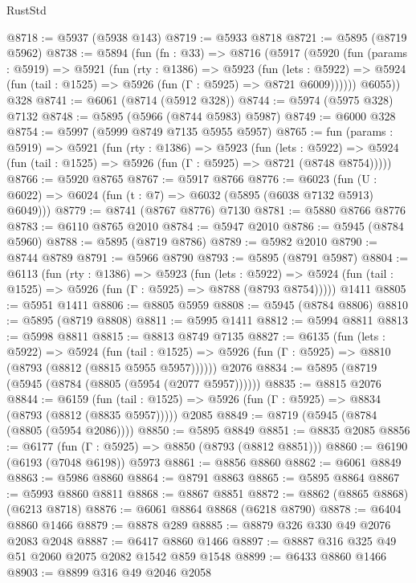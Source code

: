 \begin{lexlean}{RustStd}
\begin{coremodule}
{{@8718 := @5937 (@5938 @143)
@8719 := @5933 @8718
@8721 := @5895 (@8719 @5962)
@8738 := @5894
    (fun (fn : @33) =>
    @8716
      (@5917
        (@5920
          (fun (params : @5919) =>
          @5921
            (fun (rty : @1386) =>
            @5923
              (fun (lets : @5922) =>
              @5924 (fun (tail : @1525) => @5926 (fun (Γ : @5925) => @8721 @6009))))))
        @6055))
    @328
@8741 := @6061 (@8714 (@5912 @328))
@8744 := @5974 (@5975 @328) @7132
@8748 := @5895 (@5966 (@8744 @5983) @5987)
@8749 := @6000 @328
@8754 := @5997 (@5999 @8749 @7135 @5955 @5957)
@8765 := fun (params : @5919) =>
  @5921
    (fun (rty : @1386) =>
    @5923
      (fun (lets : @5922) =>
      @5924 (fun (tail : @1525) => @5926 (fun (Γ : @5925) => @8721 (@8748 @8754)))))
@8766 := @5920 @8765
@8767 := @5917 @8766
@8776 := @6023 (fun (U : @6022) => @6024 (fun (t : @7) => @6032 (@5895 (@6038 @7132 @5913) @6049)))
@8779 := @8741 (@8767 @8776) @7130
@8781 := @5880 @8766 @8776
@8783 := @6110 @8765 @2010
@8784 := @5947 @2010
@8786 := @5945 (@8784 @5960)
@8788 := @5895 (@8719 @8786)
@8789 := @5982 @2010
@8790 := @8744 @8789
@8791 := @5966 @8790
@8793 := @5895 (@8791 @5987)
@8804 := @6113
    (fun (rty : @1386) =>
    @5923
      (fun (lets : @5922) =>
      @5924 (fun (tail : @1525) => @5926 (fun (Γ : @5925) => @8788 (@8793 @8754)))))
    @1411
@8805 := @5951 @1411
@8806 := @8805 @5959
@8808 := @5945 (@8784 @8806)
@8810 := @5895 (@8719 @8808)
@8811 := @5995 @1411
@8812 := @5994 @8811
@8813 := @5998 @8811
@8815 := @8813 @8749 @7135
@8827 := @6135
    (fun (lets : @5922) =>
    @5924
      (fun (tail : @1525) => @5926 (fun (Γ : @5925) => @8810 (@8793 (@8812 (@8815 @5955 @5957))))))
    @2076
@8834 := @5895 (@8719 (@5945 (@8784 (@8805 (@5954 (@2077 @5957))))))
@8835 := @8815 @2076
@8844 := @6159
    (fun (tail : @1525) => @5926 (fun (Γ : @5925) => @8834 (@8793 (@8812 (@8835 @5957)))))
    @2085
@8849 := @8719 (@5945 (@8784 (@8805 (@5954 @2086))))
@8850 := @5895 @8849
@8851 := @8835 @2085
@8856 := @6177 (fun (Γ : @5925) => @8850 (@8793 (@8812 @8851)))
@8860 := @6190 (@6193 (@7048 @6198)) @5973
@8861 := @8856 @8860
@8862 := @6061 @8849
@8863 := @5986 @8860
@8864 := @8791 @8863
@8865 := @5895 @8864
@8867 := @5993 @8860 @8811
@8868 := @8867 @8851
@8872 := @8862 (@8865 @8868) (@6213 @8718)
@8876 := @6061 @8864 @8868 (@6218 @8790)
@8878 := @6404 @8860 @1466
@8879 := @8878 @289
@8885 := @8879 @326 @330 @49 @2076 @2083 @2048
@8887 := @6417 @8860 @1466
@8897 := @8887 @316 @325 @49 @51 @2060 @2075 @2082 @1542 @859 @1548
@8899 := @6433 @8860 @1466
@8903 := @8899 @316 @49 @2046 @2058
}}
\end{coremodule}
\end{lexlean}
